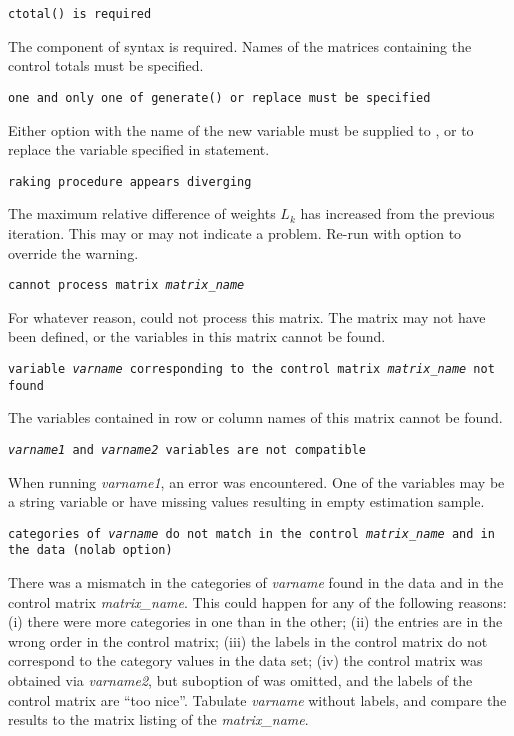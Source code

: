 \noindent
    {\tt ctotal() is required}

    \morehang
    The  component of 
    syntax is required. Names of the matrices containing the
    control totals must be specified.

    \noindent
    {\tt one and only one of generate() or replace must be specified}

    \morehang
    Either  option with the name of the new variable
    must be supplied to , or  to replace
    the variable specified in \stcmd{[pw=\ldots]} statement.

    \noindent
    {\tt raking procedure appears diverging}

    \morehang
    The maximum relative difference of weights $L_k$ has increased from
    the previous
    iteration. This may or may not indicate a problem. Re-run 
    with  option to override the warning.

    \noindent
    {\tt cannot process matrix {\it matrix{\_}name}}

    \morehang
    For whatever reason,  could not process this matrix.
    The matrix may not have been defined, or the variables in this matrix
    cannot be found.

    \noindent
    {\tt variable {\it varname} corresponding to the control matrix
    {\it matrix{\_}name} not found}

    \morehang
    The variables contained in row or column names of this matrix
    cannot be found.

    \noindent
    {\tt {\it varname1} and {\it varname2} variables are not compatible}

    \morehang
    When running  {\it varname1}\stcmd{)},
    an error was encountered. One of the variables may be a string variable
    or have missing values resulting in empty estimation sample.

    \noindent
    {\tt categories of {\it varname} do not match in the control {\it matrix{\_}name}
    and in the data (nolab option)}

    \morehang
    There was a mismatch in the categories of {\it varname} found in the data
    and in the control matrix {\it matrix{\_}name}. This could happen for any of the
    following reasons: (i) there were more categories in one than in the other;
    (ii) the entries are in the wrong order in the control matrix; (iii) the labels
    in the control matrix do not correspond to the category values in the data set;
    (iv) the control matrix was obtained via 
    {\it varname2}\stcmd{)}, but  suboption
    of  was omitted, and the labels of the control matrix are
    ``too nice''. Tabulate {\it varname} without labels, and compare the results
    to the matrix listing of the {\it matrix{\_}name}.


